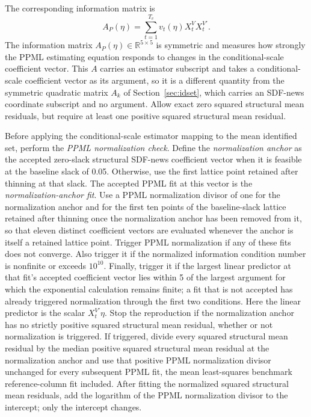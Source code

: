 \documentclass[11pt]{article}
\begin{document}
The corresponding information matrix is
\begin{equation*}
 A_P(\eta)=\sum_{t=1}^{T_v}v_t(\eta)X_t^VX_t^{V\prime}.
\end{equation*}
The information matrix \(A_P(\eta)\in\mathbb R^{5\times5}\) is symmetric and measures how strongly
the PPML estimating equation responds to changes in the conditional-scale coefficient vector. This
\(A\) carries an estimator subscript and takes a conditional-scale coefficient vector as its
argument, so it is a different quantity from the symmetric quadratic matrix \(A_k\) of
Section~\ref{sec:idset}, which carries an SDF-news coordinate subscript and no argument.
Allow exact zero squared structural mean residuals, but require at least one positive squared
structural mean residual.

Before applying the conditional-scale estimator mapping to the mean identified set, perform the
\emph{PPML normalization check}. Define the \emph{normalization
anchor} as the accepted zero-slack structural SDF-news coefficient vector when it is feasible at the
baseline slack of 0.05. Otherwise, use the first lattice point retained after thinning at that slack. The
accepted PPML fit at this vector is the \emph{normalization-anchor fit}. Use a PPML normalization
divisor of one for the normalization anchor and for the first ten points of the baseline-slack
lattice retained after thinning once the normalization anchor has been removed from it, so that
eleven distinct coefficient vectors are evaluated whenever the anchor is itself a retained lattice
point. Trigger PPML normalization if any of these fits does not converge. Also
trigger it if the normalized information condition number is nonfinite or exceeds \(10^{10}\).
Finally, trigger it if the largest linear predictor at that fit's accepted coefficient vector lies
within 5 of the largest argument for which
the exponential calculation remains finite; a fit that is not accepted has already triggered
normalization through the first two conditions. Here the linear predictor is the scalar
\(X_t^{V\prime}\eta\). Stop the reproduction if the normalization anchor has no strictly positive
squared structural mean residual, whether or not normalization is triggered. If triggered, divide
every squared structural mean residual by the median positive squared structural mean residual at
the normalization anchor and use that positive PPML normalization divisor unchanged for every
subsequent PPML fit, the mean least-squares benchmark reference-column fit included. After fitting the
normalized squared structural mean residuals, add the logarithm of the PPML normalization divisor
to the intercept; only the intercept changes.
\end{document}
